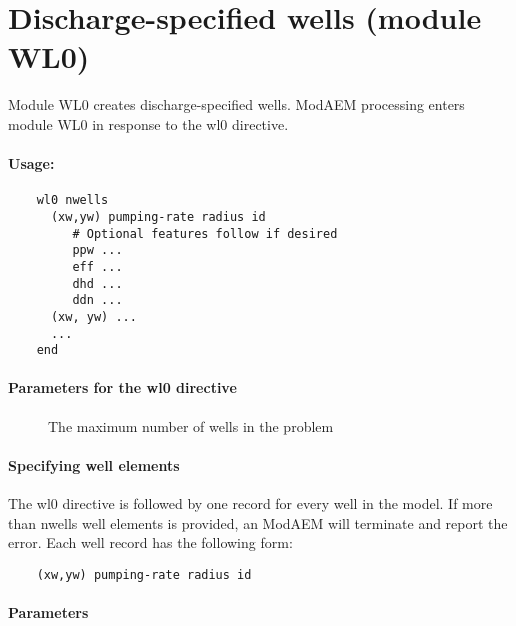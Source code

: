 \section{Discharge-specified wells (module \textsf{WL0})\label{sec:wl0-module}}

Module \textsf{WL0} creates discharge-specified wells. ModAEM processing enters module \textsf{WL0} in response to the \textsf{wl0} directive. 

\paragraph{Usage:}
\begin{verbatim}
    wl0 nwells
      (xw,yw) pumping-rate radius id 
  	     # Optional features follow if desired
         ppw ...
         eff ...
         dhd ...
         ddn ...
      (xw, yw) ...
      ...
    end
\end{verbatim}

\paragraph{Parameters for the \textsf{wl0} directive}

\begin{description}
  \item [] The maximum number of wells in the problem \units{-}
\end{description}

\paragraph{Specifying well elements}

The \textsf{wl0} directive is followed by one record for every well
in the model. If more than nwells well elements is provided, an ModAEM
will terminate and report the error. Each well record has the following
form:
\begin{verbatim}
    (xw,yw) pumping-rate radius id
\end{verbatim}

\paragraph{Parameters}

